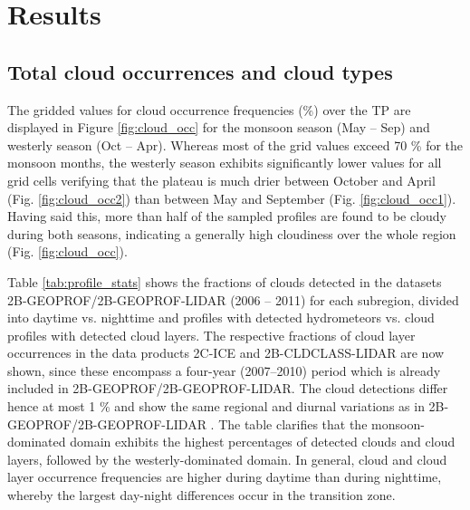 \documentclass[alpha-refs]{wiley-article}
\begin{document}
    
\section{Results}
\subsection{Total cloud occurrences and cloud types}

The gridded values for cloud occurrence frequencies (\%) over the TP are displayed in Figure \ref{fig:cloud_occ} for the monsoon season (May -- Sep) and westerly season (Oct -- Apr). Whereas most of the grid values exceed 70 \% for the monsoon months, the westerly season exhibits significantly lower values for all grid cells verifying that the plateau is much drier between October and April (Fig. \ref{fig:cloud_occ2}) than between May and September (Fig. \ref{fig:cloud_occ1}). Having said this, more than half of the sampled profiles are found to be cloudy during both seasons, indicating a generally high cloudiness over the whole region (Fig. \ref{fig:cloud_occ}). 

Table \ref{tab:profile_stats} shows the fractions of clouds detected in the datasets 2B-GEOPROF/2B-GEOPROF-LIDAR (2006 -- 2011) for each subregion, divided into daytime vs. nighttime and profiles with detected hydrometeors vs. cloud profiles with detected cloud layers. The respective fractions of cloud layer occurrences in the data products 2C-ICE and 2B-CLDCLASS-LIDAR are now shown, since these encompass a four-year (2007--2010) period which is already included in 2B-GEOPROF/2B-GEOPROF-LIDAR. The cloud detections differ hence at most 1 \% and show the same regional and diurnal variations as in 2B-GEOPROF/2B-GEOPROF-LIDAR . 
The table clarifies that the monsoon-dominated domain exhibits the highest percentages of detected clouds and cloud layers, followed by the westerly-dominated domain. In general, cloud and cloud layer occurrence frequencies are higher during daytime than during nighttime, whereby the largest day-night differences occur in the transition zone. 
\end{document}
